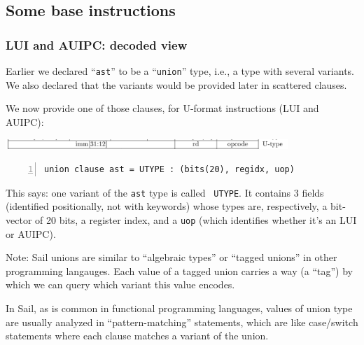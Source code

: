 \documentclass[aspectratio=169]{beamer}
\newcommand{\slidefont}{\scriptsize}
\newcommand{\cf}{\scriptsize\tt}
\begin{document}

\subsection{Some base instructions}


\begin{frame}[fragile]
  \frametitle{LUI and AUIPC: decoded view}

  \slidefont

  Earlier we declared ``{\cf ast}'' to be a ``{\cf union}'' type,
  i.e., a type with several variants.  We also declared that the
  variants would be provided later in scattered clauses.

  \vspace{1ex}
    
  We now provide one of those clauses, for U-format instructions (LUI and AUIPC):

  \begin{center}
    \includegraphics[width=0.8\textwidth]{Figures/Fig_RISCV_U_format.png}
  \end{center}

  \vspace{1ex}
    
  \begin{Verbatim}[frame=single, numbers=left, label = File riscv\_insts\_base.sail]
union clause ast = UTYPE : (bits(20), regidx, uop)
  \end{Verbatim}

  \begin{minipage}{\textwidth}
    This says: one variant of the {\cf ast} type is called {\cf
      UTYPE}.  It contains 3 fields (identified positionally, not with
    keywords) whose types are, respectively, a bit-vector of 20 bits,
    a register index, and a {\cf uop} (which identifies whether it's
    an LUI or AUIPC).

    \vspace{1ex}

    Note: Sail unions are similar to ``algebraic types'' or ``tagged
    unions'' in other programming langauges.  Each value of a tagged
    union carries a way (a ``tag'') by which we can query which
    variant this value encodes.

    \vspace{1ex}

    In Sail, as is common in functional programming languages, values
    of union type are usually analyzed in ``pattern-matching''
    statements, which are like case/switch statements where each
    clause matches a variant of the union.
  \end{minipage}

\end{frame}
\end{document}
